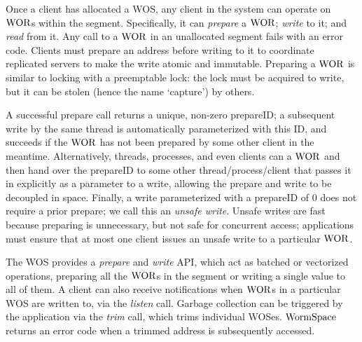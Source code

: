 Once a client has allocated a WOS, any client in the system can operate on $\mathrm{WOR}$s within the segment. 
Specifically, it can \textit{prepare} a $\mathrm{WOR}$; \textit{write} to it; and \textit{read} from it.
Any call to a $\mathrm{WOR}$ in an unallocated segment fails with an error code. 
Clients must prepare an address before writing to it to coordinate replicated servers to make the write atomic and immutable.
Preparing a $\mathrm{WOR}$ is similar to locking with a preemptable lock: the lock must be acquired to write, but it can be stolen (hence the name `capture') by others.

A successful prepare call returns a unique, non-zero prepareID; a subsequent write by the same thread is automatically parameterized with this ID, and succeeds if the $\mathrm{WOR}$ has not been prepared by some other client in the meantime. Alternatively, threads, processes, and even clients can  a $\mathrm{WOR}$ and then hand over the prepareID to some other thread/process/client that passes it in explicitly as a parameter to a write, allowing the prepare and write to be decoupled in space. Finally, a write parameterized with a prepareID of 0 does not require a prior prepare; we call this an \textit{unsafe write}. 
Unsafe writes are fast because preparing is unnecessary, but not safe for concurrent access; applications must ensure that at most one client issues an unsafe write to a particular $\mathrm{WOR}$.

The WOS provides a \textit{prepare} and \textit{write} API, which act as batched or vectorized operations, preparing all the $\mathrm{WOR}$s in the segment or writing a single value to all of them.
A client can also receive notifications when $\mathrm{WOR}$s in a particular WOS are written to, via the \textit{listen} call.
Garbage collection can be triggered by the application via the \textit{trim} call, which trims individual WOSes. 
$\mathrm{WormSpace}$ returns an error code when a trimmed address is subsequently accessed.


